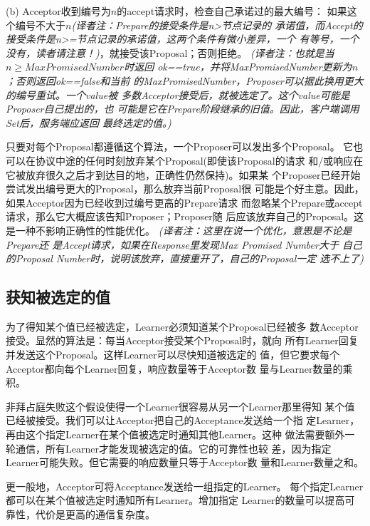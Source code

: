 (b) Acceptor收到编号为\(n\)的accept请求时，检查自己承诺过的最大编号：
如果这个编号不大于\(n\)\emph{(译者注：Prepare的接受条件是n>节点记录的
承诺值，而Accept的接受条件是n>=节点记录的承诺值，这两个条件有微小差异，一个
有等号，一个没有，读者请注意！)}，就接受该Proposal；否则拒绝。
\emph{(译者注：也就是当\(n \geq MaxPromisedNumber\)时返回
ok==true，并将MaxPromisedNumber更新为\(n\)；否则返回ok==false和当前
的MaxPromisedNumber，Proposer可以据此换用更大的编号重试。一个value被
多数Acceptor接受后，就被选定了。这个value可能是Proposer自己提出的，也
可能是它在Prepare阶段继承的旧值。因此，客户端调用Set后，服务端应返回
最终选定的值。)}

只要对每个Proposal都遵循这个算法，一个Proposer可以发出多个Proposal。
它也可以在协议中途的任何时刻放弃某个Proposal(即使该Proposal的请求
和/或响应在它被放弃很久之后才到达目的地，正确性仍然保持)。如果某
个Proposer已经开始尝试发出编号更大的Proposal，那么放弃当前Proposal很
可能是个好主意。因此，如果Acceptor因为已经收到过编号更高的Prepare请求
而忽略某个Prepare或accept请求，那么它大概应该告知Proposer；Proposer随
后应该放弃自己的Proposal。这是一种不影响正确性的性能优化。
\emph{(译者注：这里在说一个优化，意思是不论是Prepare还
是Accept请求，如果在Response里发现Max Promised Number大于
自己的Proposal Number时，说明该放弃，直接重开了，自己的Proposal一定
选不上了)}

\subsection{获知被选定的值}
为了得知某个值已经被选定，Learner必须知道某个Proposal已经被多
数Acceptor接受。显然的算法是：每当Acceptor接受某个Proposal时，就向
所有Learner回复并发送这个Proposal。这样Learner可以尽快知道被选定的
值，但它要求每个Acceptor都向每个Learner回复，响应数量等于Acceptor数
量与Learner数量的乘积。

非拜占庭失败这个假设使得一个Learner很容易从另一个Learner那里得知
某个值已经被接受。我们可以让Acceptor把自己的Acceptance发送给一个指
定Learner，再由这个指定Learner在某个值被选定时通知其他Learner。这种
做法需要额外一轮通信，所有Learner才能发现被选定的值。它的可靠性也较
差，因为指定Learner可能失败。但它需要的响应数量只等于Acceptor数
量和Learner数量之和。

更一般地，Acceptor可将Acceptance发送给一组指定的Learner。
每个指定Learner都可以在某个值被选定时通知所有Learner。增加指定
Learner的数量可以提高可靠性，代价是更高的通信复杂度。


